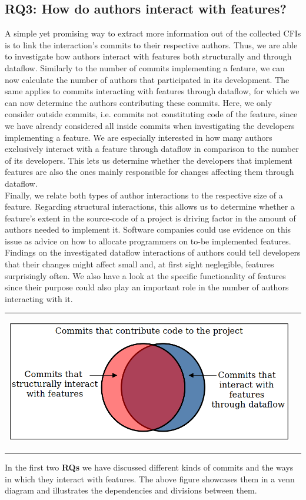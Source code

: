 \subsection*{\textbf{RQ3: How do authors interact with features?}}

A simple yet promising way to extract more information out of the collected CFIs is to link the interaction's commits to their respective authors.
Thus, we are able to investigate how authors interact with features both structurally and through dataflow.
Similarly to the number of commits implementing a feature, we can now calculate the number of authors that participated in its development.
The same applies to commits interacting with features through dataflow, for which we can now determine the authors contributing these commits.
Here, we only consider outside commits, i.e. commits not constituting code of the feature, since we have already considered all inside commits when investigating the developers implementing a feature.
We are especially interested in how many authors exclusively interact with a feature through dataflow in comparison to the number of its developers.
This lets us determine whether the developers that implement features are also the ones mainly responsible for changes affecting them through dataflow. \\
Finally, we relate both types of author interactions to the respective size of a feature.
Regarding structural interactions, this allows us to determine whether a feature's extent in the source-code of a project is driving factor in the amount of authors needed to implement it. 
Software companies could use evidence on this issue as advice on how to allocate programmers on to-be implemented features.
Findings on the investigated dataflow interactions of authors could tell developers that their changes might affect small and, at first sight neglegible, features surprisingly often.
We also have a look at the specific functionality of features since their purpose could also play an important role in the number of authors interacting with it.

\begin{center}
\begin{tabular}{cc}
\includegraphics[height=6cm]{gfx/Commits-of-a-Software-Project.png}
\end{tabular}
\end{center}
\textsf{
In the first two \textbf{RQs} we have discussed different kinds of commits and the ways in which they interact with features. 
The above figure showcases them in a venn diagram and illustrates the dependencies and divisions between them.
}

